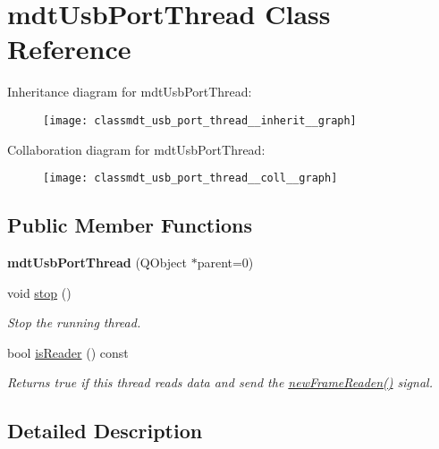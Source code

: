 \hypertarget{classmdt_usb_port_thread}{
\section{mdtUsbPortThread Class Reference}
\label{classmdt_usb_port_thread}
}


Inheritance diagram for mdtUsbPortThread:\nopagebreak
\begin{figure}[H]
\begin{center}
\leavevmode
\texttt{[image: classmdt\_usb\_port\_thread\_\_inherit\_\_graph]}
\end{center}
\end{figure}


Collaboration diagram for mdtUsbPortThread:\nopagebreak
\begin{figure}[H]
\begin{center}
\leavevmode
\texttt{[image: classmdt\_usb\_port\_thread\_\_coll\_\_graph]}
\end{center}
\end{figure}
\subsection*{Public Member Functions}
\begin{DoxyCompactItemize}
\item 
\hypertarget{classmdt_usb_port_thread_aaf4e5883224f05d80132b31a921ac899}{
{\bfseries mdtUsbPortThread} (QObject $\ast$parent=0)}
\label{classmdt_usb_port_thread_aaf4e5883224f05d80132b31a921ac899}

\item 
void \hyperlink{classmdt_usb_port_thread_a0be9bce0248ada81087282deea70505b}{stop} ()
\begin{DoxyCompactList}\small\item\em Stop the running thread. \end{DoxyCompactList}\item 
bool \hyperlink{classmdt_usb_port_thread_aed82b57c84745f1e2391750697db1022}{isReader} () const 
\begin{DoxyCompactList}\small\item\em Returns true if this thread reads data and send the \hyperlink{classmdt_port_thread_a7fc2245c753fd65e1beffec211c41461}{newFrameReaden()} signal. \end{DoxyCompactList}\end{DoxyCompactItemize}


\subsection{Detailed Description}


